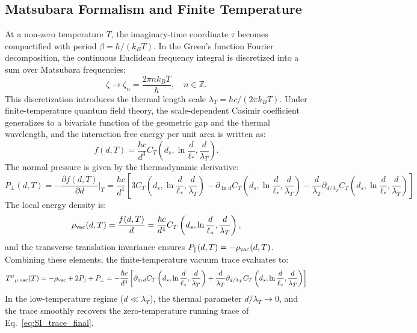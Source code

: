 \documentclass[12pt,letterpaper]{article}
\begin{document}
\subsection{Matsubara Formalism and Finite Temperature}
At a non-zero temperature $T$, the imaginary-time coordinate $\tau$ becomes compactified with period $\beta = \hbar / (k_B T)$. In the Green's function Fourier decomposition, the continuous Euclidean frequency integral is discretized into a sum over Matsubara frequencies:
\begin{equation}
\zeta \to \zeta_n = \frac{2\pi n k_B T}{\hbar}, \quad n \in \mathbb{Z}.
\label{eq:SI_matsubara}
\end{equation}
This discretization introduces the thermal length scale $\lambda_T = \hbar c / (2\pi k_B T)$. Under finite-temperature quantum field theory, the scale-dependent Casimir coefficient generalizes to a bivariate function of the geometric gap and the thermal wavelength, and the interaction free energy per unit area is written as:
\begin{equation}
f(d, T) = \frac{\hbar c}{d^3} C_T\left(d_s, \ln\frac{d}{\ell_*}, \frac{d}{\lambda_T}\right).
\label{eq:SI_free_energy}
\end{equation}
The normal pressure is given by the thermodynamic derivative:
\begin{equation}
P_\perp(d, T) = -\frac{\partial f(d, T)}{\partial d} \Big|_T = \frac{\hbar c}{d^4} \left[ 3 C_T\left(d_s, \ln\frac{d}{\ell_*}, \frac{d}{\lambda_T}\right) - \partial_{\ln d} C_T\left(d_s, \ln\frac{d}{\ell_*}, \frac{d}{\lambda_T}\right) - \frac{d}{\lambda_T} \partial_{d/\lambda_T} C_T\left(d_s, \ln\frac{d}{\ell_*}, \frac{d}{\lambda_T}\right) \right]
\label{eq:SI_P_perp_thermal}
\end{equation}
The local energy density is:
\begin{equation}
\rho_{\rm vac}(d, T) = \frac{f(d, T)}{d} = \frac{\hbar c}{d^4} C_T\left(d_s, \ln\frac{d}{\ell_*}, \frac{d}{\lambda_T}\right),
\label{eq:SI_rho_thermal}
\end{equation}
and the transverse translation invariance ensures $P_\parallel(d, T) = -\rho_{\rm vac}(d, T)$. Combining these elements, the finite-temperature vacuum trace evaluates to:
\begin{equation}
T^\mu{}_{\mu,\rm vac}(T) = -\rho_{\rm vac} + 2P_\parallel + P_\perp = -\frac{\hbar c}{d^4} \left[ \partial_{\ln d} C_T\left(d_s, \ln\frac{d}{\ell_*}, \frac{d}{\lambda_T}\right) + \frac{d}{\lambda_T} \partial_{d/\lambda_T} C_T\left(d_s, \ln\frac{d}{\ell_*}, \frac{d}{\lambda_T}\right) \right]
\label{eq:SI_trace_thermal}
\end{equation}
In the low-temperature regime ($d \ll \lambda_T$), the thermal parameter $d/\lambda_T \to 0$, and the trace smoothly recovers the zero-temperature running trace of Eq.~\eqref{eq:SI_trace_final}.
\end{document}

